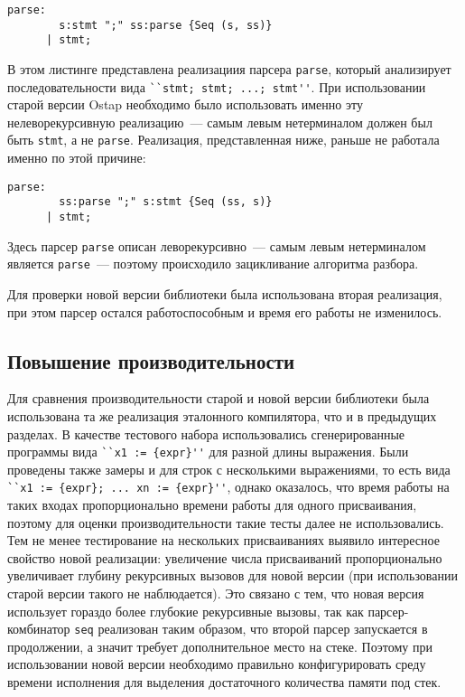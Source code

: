 \documentclass[conference]{IEEEtran}
\begin{document}
\begin{lstlisting}[basicstyle=\small]
  parse:
        s:stmt ";" ss:parse {Seq (s, ss)}
      | stmt;
\end{lstlisting}

В этом листинге представлена реализациия парсера \lstinline|parse|, который анализирует последовательности вида \lstinline|``stmt; stmt; ...; stmt''|. При использовании старой
версии Ostap необходимо было использовать именно эту нелеворекурсивную реализацию~--- самым левым нетерминалом должен был быть \lstinline|stmt|, а не \lstinline|parse|. Реализация,
представленная ниже, раньше не работала именно по этой причине:

\begin{lstlisting}[basicstyle=\small]
  parse:
        ss:parse ";" s:stmt {Seq (ss, s)}
      | stmt;
\end{lstlisting}

Здесь парсер \lstinline|parse| описан леворекурсивно~--- самым левым нетерминалом является \lstinline|parse|~--- поэтому происходило зацикливание алгоритма разбора.

Для проверки новой версии библиотеки была использована вторая реализация, при этом парсер остался работоспособным и время его работы не изменилось.

\subsection{Повышение производительности}

Для сравнения производительности старой и новой версии библиотеки была использована та же реализация эталонного компилятора, что и в предыдущих разделах. В качестве тестового
набора использовались сгенерированные программы вида \lstinline|``x1 := {expr}''| для разной длины выражения.  Были проведены также замеры и для строк с несколькими
выражениями, то есть вида \lstinline|``x1 := {expr}; ... xn := {expr}''|, однако оказалось, что время работы на таких входах пропорционально времени работы для одного присваивания,
поэтому для оценки производительности такие тесты далее не использовались. Тем не менее тестирование на нескольких присваиваниях выявило интересное свойство новой реализации:
увеличение числа присваиваний пропорционально увеличивает глубину рекурсивных вызовов для новой версии (при использовании старой версии такого не наблюдается). Это связано с тем,
что новая версия использует гораздо более глубокие рекурсивные вызовы, так как парсер-комбинатор \lstinline|seq| реализован таким образом, что второй парсер запускается в продолжении,
а значит требует дополнительное место на стеке. Поэтому при использовании новой версии необходимо правильно конфигурировать среду времени исполнения для выделения достаточного
количества памяти под стек.
\end{document}
